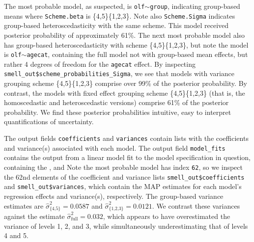 
The most probable model, as suspected, is \texttt{olf}$\sim$\texttt{group}, indicating group-based means where \texttt{Scheme.beta} is \{4,5\}\{1,2,3\}. Note also \texttt{Scheme.Sigma} indicates group-based heteroscedasticity with the same scheme. This model received posterior probability of approximately 61\%. The next most probable model also has group-based heteroscedasticity with scheme \{4,5\}\{1,2,3\}, but note the model is \texttt{olf}$\sim$\texttt{agecat}, containing the full model not with group-based mean effects, but rather 4 degrees of freedom for the \texttt{agecat} effect. By inspecting \texttt{smell\_out\$scheme\_probabilities\_Sigma}, we see that models with variance grouping scheme \{4,5\}\{1,2,3\} comprise over 99\% of the posterior probability. By contrast, the models with fixed effect grouping scheme \{4,5\}\{1,2,3\} (that is, the homoscedastic and heteroscedastic versions) comprise 61\% of the posterior probability. We find these posterior probabilities intuitive, easy to interpret quantifications of uncertainty. 

The output fields \texttt{coefficients} and \texttt{variances} contain lists with the coefficients and variance(s) associated with each model. The output field \texttt{model\_fits} contains the output from a linear model fit to the model specification in question, containing the , and Note the most probable model has index \texttt{62}, so we inspect the 62nd elements of the coefficient and variance lists \texttt{smell\_out\$coefficients} and \texttt{smell\_out\$variances}, which contain the MAP estimates for each model's regression effects and variance(s), respectively. The group-based variance estimates are $\hat{\sigma}^2_{}=0.0587$ and $\hat{\sigma}^2_{}=0.0121$. We contrast these variances against the estimate $\hat{\sigma}^2_{}=0.032$, which appears to have overestimated the variance of levels 1, 2, and 3, while simultaneously underestimating that of levels 4 and 5. 

